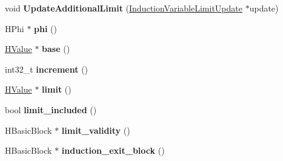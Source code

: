 \begin{DoxyCompactItemize}
\item 
\hypertarget{classv8_1_1internal_1_1_v8___f_i_n_a_l_a8895ed87288e5c6bddbbbcbdc0e622f8}{}void {\bfseries Update\+Additional\+Limit} (\hyperlink{structv8_1_1internal_1_1_induction_variable_limit_update}{Induction\+Variable\+Limit\+Update} $\ast$update)\label{classv8_1_1internal_1_1_v8___f_i_n_a_l_a8895ed87288e5c6bddbbbcbdc0e622f8}

\item 
\hypertarget{classv8_1_1internal_1_1_v8___f_i_n_a_l_a7885228ba48cb80dacbf2857b5040080}{}H\+Phi $\ast$ {\bfseries phi} ()\label{classv8_1_1internal_1_1_v8___f_i_n_a_l_a7885228ba48cb80dacbf2857b5040080}

\item 
\hypertarget{classv8_1_1internal_1_1_v8___f_i_n_a_l_a593b653cf76589ec1234489359e585ba}{}\hyperlink{classv8_1_1internal_1_1_h_value}{H\+Value} $\ast$ {\bfseries base} ()\label{classv8_1_1internal_1_1_v8___f_i_n_a_l_a593b653cf76589ec1234489359e585ba}

\item 
\hypertarget{classv8_1_1internal_1_1_v8___f_i_n_a_l_af8e00d4b8f9540b307d4c9f62d43bf52}{}int32\+\_\+t {\bfseries increment} ()\label{classv8_1_1internal_1_1_v8___f_i_n_a_l_af8e00d4b8f9540b307d4c9f62d43bf52}

\item 
\hypertarget{classv8_1_1internal_1_1_v8___f_i_n_a_l_a79fb614b67571e5698f36405b40e7ee9}{}\hyperlink{classv8_1_1internal_1_1_h_value}{H\+Value} $\ast$ {\bfseries limit} ()\label{classv8_1_1internal_1_1_v8___f_i_n_a_l_a79fb614b67571e5698f36405b40e7ee9}

\item 
\hypertarget{classv8_1_1internal_1_1_v8___f_i_n_a_l_aea67382d277cfbab143816a1eeb29c38}{}bool {\bfseries limit\+\_\+included} ()\label{classv8_1_1internal_1_1_v8___f_i_n_a_l_aea67382d277cfbab143816a1eeb29c38}

\item 
\hypertarget{classv8_1_1internal_1_1_v8___f_i_n_a_l_aa9e0f9e6932ac76aff83e82e119e8b5c}{}H\+Basic\+Block $\ast$ {\bfseries limit\+\_\+validity} ()\label{classv8_1_1internal_1_1_v8___f_i_n_a_l_aa9e0f9e6932ac76aff83e82e119e8b5c}

\item 
\hypertarget{classv8_1_1internal_1_1_v8___f_i_n_a_l_ac9f77e14d5f6d1e66e242e52b174f7f3}{}H\+Basic\+Block $\ast$ {\bfseries induction\+\_\+exit\+\_\+block} ()\label{classv8_1_1internal_1_1_v8___f_i_n_a_l_ac9f77e14d5f6d1e66e242e52b174f7f3}


\end{DoxyCompactItemize}
